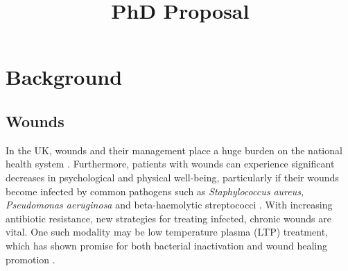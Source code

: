 \documentclass[11pt, oneside]{article}   	%
\title{PhD Proposal}
\date{}							%
\begin{document}
\maketitle
\section*{Background}
\subsection*{Wounds}

In the UK, wounds and their management place a huge burden on the national health system \cite{Posnett2008burden}. 
Furthermore, patients with wounds can experience significant decreases in psychological and physical well-being, particularly if their wounds become infected by common pathogens such as \textit{Staphylococcus aureus, Pseudomonas aeruginosa} and beta-haemolytic streptococci \cite{Franks2003health, Bowler2001wound}. 
With increasing antibiotic resistance, new strategies for treating infected, chronic wounds are vital.
One such modality may be low temperature plasma (LTP) treatment, which has shown promise for both bacterial inactivation and wound healing promotion \cite{Kong2009plasma, Kramer2013suitability, Isbary2012successful, Isbary2010a}.

\end{document}

